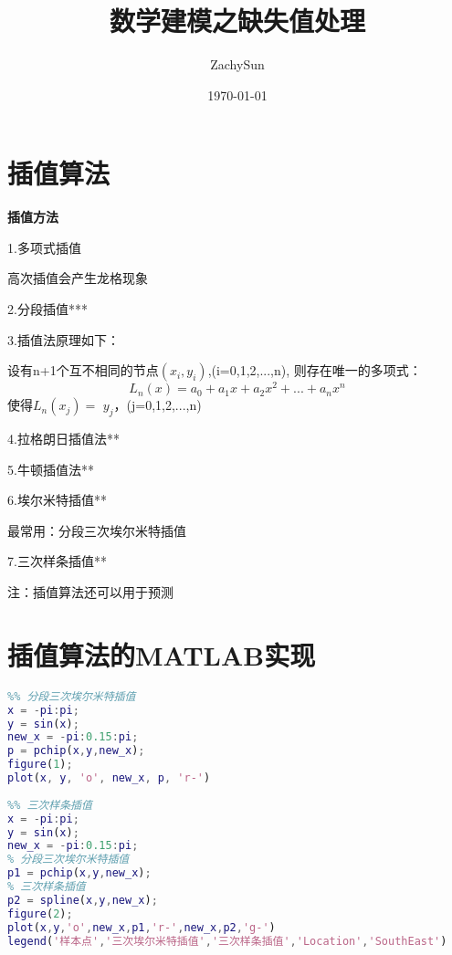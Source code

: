 \documentclass{article}
\title{数学建模之缺失值处理}
\date{\today}
\author{ZachySun}
\begin{document}
\maketitle

\section{插值算法}
\textbf{插值方法}

1.多项式插值

高次插值会产生龙格现象

2.分段插值***

3.插值法原理如下：

设有n+1个互不相同的节点$(x_{i},y_{i})$,(i=0,1,2,...,n),
则存在唯一的多项式：
$$
L_n\left( x \right) =a_0+a_1x+a_2x^2+...+a_nx^n
$$
使得$L_n\left( x_j \right) =\,\,y_j$，(j=0,1,2,...,n)

4.拉格朗日插值法**

5.牛顿插值法**

6.埃尔米特插值**

最常用：分段三次埃尔米特插值

7.三次样条插值**

注：插值算法还可以用于预测
\section{插值算法的MATLAB实现}

\begin{lstlisting}[language=Matlab]
%% nan_data
%% 分段三次埃尔米特插值
x = -pi:pi; 
y = sin(x); 
new_x = -pi:0.15:pi;
p = pchip(x,y,new_x);
figure(1); 
plot(x, y, 'o', new_x, p, 'r-')
    
%% 三次样条插值
x = -pi:pi; 
y = sin(x); 
new_x = -pi:0.15:pi;
% 分段三次埃尔米特插值
p1 = pchip(x,y,new_x);   
% 三次样条插值
p2 = spline(x,y,new_x);  
figure(2);
plot(x,y,'o',new_x,p1,'r-',new_x,p2,'g-')
legend('样本点','三次埃尔米特插值','三次样条插值','Location','SouthEast')   

\end{lstlisting} 
\end{document}
